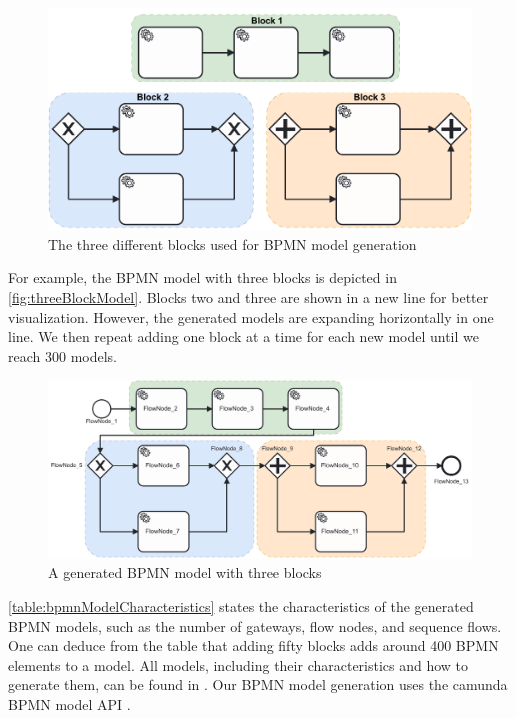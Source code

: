 \documentclass{lmcs} %
\begin{document}
\begin{figure}[ht]
    \centering
    \includegraphics[width=1\textwidth]{images/blocks.pdf}
    \caption{The three different blocks used for BPMN model generation}
    \label{fig:blocks}
\end{figure}

For example, the BPMN model with three blocks is depicted in \autoref{fig:threeBlockModel}.
Blocks two and three are shown in a new line for better visualization.
However, the generated models are expanding horizontally in one line.
We then repeat adding one block at a time for each new model until we reach 300 models.

\begin{figure}[ht]
    \centering
    \includegraphics[width=1\textwidth]{images/003.pdf}
    \caption{A generated BPMN model with three blocks}
    \label{fig:threeBlockModel}
\end{figure}

\autoref{table:bpmnModelCharacteristics} states the characteristics of the generated BPMN models, such as the number of gateways, flow nodes, and sequence flows.
One can deduce from the table that adding fifty blocks adds around 400 BPMN elements to a model.
All models, including their characteristics and how to generate them, can be found in \cite{timkrauterLMCS2024Artifacts2023}.
Our BPMN model generation uses the camunda BPMN model API \cite{camundaservicesgmbhCamundaBPMNModel2023}.
\end{document}

